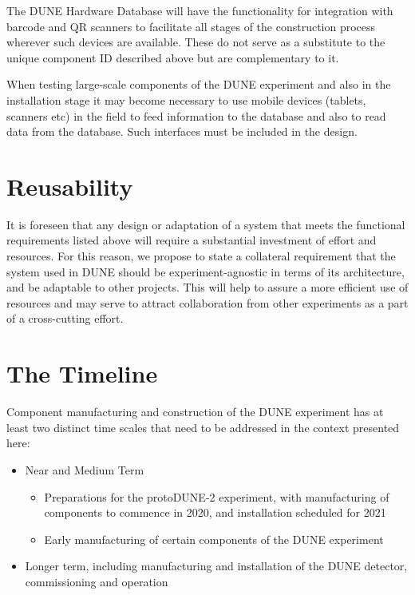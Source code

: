\documentclass[pdftex,12pt,letter]{article}
\begin{document}
The DUNE Hardware Database will have the functionality for integration with barcode and QR scanners to facilitate
all stages of the construction process wherever such devices are available. These do not serve as a substitute to the
unique component ID described above but are complementary to it.

When testing large-scale components of the DUNE experiment and also in the installation stage
it may become necessary to use mobile devices (tablets, scanners etc) in the field to feed information to the database
and also to read data from the database. Such interfaces must be included in the design.




\section{Reusability}

It is foreseen that any design or adaptation of a system that meets the functional requirements listed
above will require a substantial investment of effort and resources. For this reason, we propose to
state a collateral requirement that the system used in DUNE should be experiment-agnostic in
terms of its architecture, and be adaptable to other projects. This will help to assure a more
efficient use of resources and may serve to attract collaboration from other experiments
as a part of a cross-cutting effort.

\section{The Timeline}
Component manufacturing and construction of the DUNE experiment has at least two distinct time
scales that need to be addressed in the context presented here:

\begin{itemize}

\item Near and Medium Term
\begin{itemize}

\item Preparations for the protoDUNE-2 experiment, with manufacturing of components to commence in 2020, and installation scheduled for 2021
\item Early manufacturing of certain components of the DUNE experiment
\end{itemize}

\item Longer term, including manufacturing and installation of the DUNE detector, commissioning and operation
\end{itemize}
\end{document}
